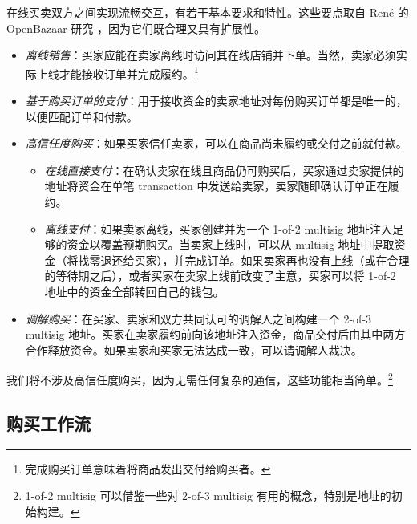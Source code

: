 在线买卖双方之间实现流畅交互，有若干基本要求和特性。这些要点取自 Ren\'e 的 OpenBazaar 研究 \cite{openbazaar-rbrunner-investigation}，因为它们既合理又具有扩展性。
\begin{itemize}
    \item {\em 离线销售}：买家应能在卖家离线时访问其在线店铺并下单。当然，卖家必须实际上线才能接收订单并完成履约。\footnote{完成购买订单意味着将商品发出交付给购买者。}
    \item {\em 基于购买订单的支付}：用于接收资金的卖家地址对每份购买订单都是唯一的，以便匹配订单和付款。
    \item {\em 高信任度购买}：如果买家信任卖家，可以在商品尚未履约或交付之前就付款。
    \begin{itemize}
        \item {\em 在线直接支付}：在确认卖家在线且商品仍可购买后，买家通过卖家提供的地址将资金在单笔 transaction 中发送给卖家，卖家随即确认订单正在履约。
        \item {\em 离线支付}：如果卖家离线，买家创建并为一个 1-of-2 multisig 地址注入足够的资金以覆盖预期购买。当卖家上线时，可以从 multisig 地址中提取资金（将找零退还给买家），并完成订单。如果卖家再也没有上线（或在合理的等待期之后），或者买家在卖家上线前改变了主意，买家可以将 1-of-2 地址中的资金全部转回自己的钱包。
    \end{itemize}{}
    \item {\em 调解购买}：在买家、卖家和双方共同认可的调解人之间构建一个 2-of-3 multisig 地址。买家在卖家履约前向该地址注入资金，商品交付后由其中两方合作释放资金。如果卖家和买家无法达成一致，可以请调解人裁决。
\end{itemize}

我们将不涉及高信任度购买，因为无需任何复杂的通信，这些功能相当简单。\footnote{1-of-2 multisig 可以借鉴一些对 2-of-3 multisig 有用的概念，特别是地址的初始构建。}


\subsection{购买工作流}
\label{subsec:escrowed-marketplace-purchasing-work-flow}

